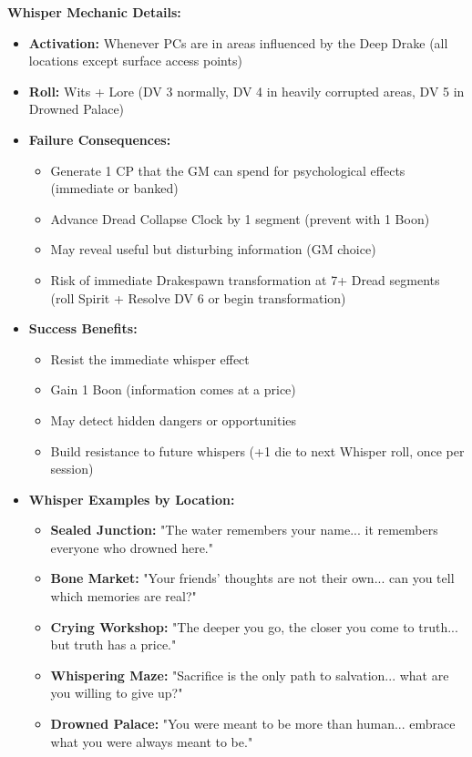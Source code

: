\documentclass[11pt]{article}
\begin{document}
\textbf{Whisper Mechanic Details:}
\begin{itemize}
\item \textbf{Activation:} Whenever PCs are in areas influenced by the Deep Drake (all locations except surface access points)
\item \textbf{Roll:} Wits + Lore (DV 3 normally, DV 4 in heavily corrupted areas, DV 5 in Drowned Palace)
\item \textbf{Failure Consequences:}
  \begin{itemize}
  \item Generate 1 CP that the GM can spend for psychological effects (immediate or banked)
  \item Advance Dread Collapse Clock by 1 segment (prevent with 1 Boon)
  \item May reveal useful but disturbing information (GM choice)
  \item Risk of immediate Drakespawn transformation at 7+ Dread segments (roll Spirit + Resolve DV 6 or begin transformation)
  \end{itemize}
\item \textbf{Success Benefits:}
  \begin{itemize}
  \item Resist the immediate whisper effect
  \item Gain 1 Boon (information comes at a price)
  \item May detect hidden dangers or opportunities
  \item Build resistance to future whispers (+1 die to next Whisper roll, once per session)
  \end{itemize}
\item \textbf{Whisper Examples by Location:}
  \begin{itemize}
  \item \textbf{Sealed Junction:} "The water remembers your name... it remembers everyone who drowned here."
  \item \textbf{Bone Market:} "Your friends' thoughts are not their own... can you tell which memories are real?"
  \item \textbf{Crying Workshop:} "The deeper you go, the closer you come to truth... but truth has a price."
  \item \textbf{Whispering Maze:} "Sacrifice is the only path to salvation... what are you willing to give up?"
  \item \textbf{Drowned Palace:} "You were meant to be more than human... embrace what you were always meant to be."
  \end{itemize}
\end{itemize}
\end{document}
